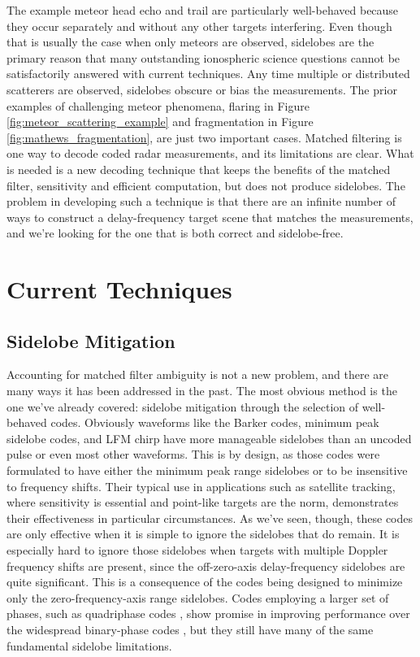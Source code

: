 The example meteor head echo and trail are particularly well-behaved because they occur separately and without any other targets interfering. Even though that is usually the case when only meteors are observed, sidelobes are the primary reason that many outstanding ionospheric science questions cannot be satisfactorily answered with current techniques. Any time multiple or distributed scatterers are observed, sidelobes obscure or bias the measurements. The prior examples of challenging meteor phenomena, flaring in Figure \ref{fig:meteor_scattering_example} and fragmentation in Figure \ref{fig:mathews_fragmentation}, are just two important cases. Matched filtering is one way to decode coded radar measurements, and its limitations are clear. What is needed is a new decoding technique that keeps the benefits of the matched filter, sensitivity and efficient computation, but does not produce sidelobes. The problem in developing such a technique is that there are an infinite number of ways to construct a delay-frequency target scene that matches the measurements, and we're looking for the one that is both correct and sidelobe-free.

\section{Current Techniques}
\label{current_radar_techniques}
\subsection{Sidelobe Mitigation}
Accounting for matched filter ambiguity is not a new problem, and there are many ways it has been addressed in the past. The most obvious method is the one we've already covered: sidelobe mitigation through the selection of well-behaved codes. Obviously waveforms like the Barker codes, minimum peak sidelobe codes, and LFM chirp have more manageable sidelobes than an uncoded pulse or even most other waveforms. This is by design, as those codes were formulated to have either the minimum peak range sidelobes or to be insensitive to frequency shifts. Their typical use in applications such as satellite tracking, where sensitivity is essential and point-like targets are the norm, demonstrates their effectiveness in particular circumstances. As we've seen, though, these codes are only effective when it is simple to ignore the sidelobes that do remain. It is especially hard to ignore those sidelobes when targets with multiple Doppler frequency shifts are present, since the off-zero-axis delay-frequency sidelobes are quite significant. This is a consequence of the codes being designed to minimize only the zero-frequency-axis range sidelobes. Codes employing a larger set of phases, such as quadriphase codes \autocite{DLOV08}, show promise in improving performance over the widespread binary-phase codes \autocite{VLR+13}, but they still have many of the same fundamental sidelobe limitations.

